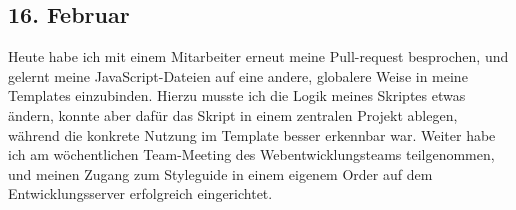 \subsection{16. Februar}
Heute habe ich mit einem Mitarbeiter erneut meine Pull-request besprochen, und gelernt meine JavaScript-Dateien auf eine andere, globalere Weise in meine Templates einzubinden. Hierzu musste ich die Logik meines Skriptes etwas ändern, konnte aber dafür das Skript in einem zentralen Projekt ablegen, während die konkrete Nutzung im Template besser erkennbar war. Weiter habe ich am wöchentlichen Team-Meeting des Webentwicklungsteams teilgenommen, und meinen Zugang zum Styleguide in einem eigenem Order auf dem Entwicklungsserver erfolgreich eingerichtet.